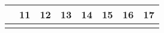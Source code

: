 {\begin{tabularx}{\linewidth}{|l!{\vrule width \myLenLineThicknessThick}*{7}{@{}X@{}|}}
    
  
  
  
  \hyperlink{week-2027-2}{} &
    
      
      
        \begin{minipage}[t]{6mm}\centering{}11\end{minipage}
      
       & 
    
      
      
        \begin{minipage}[t]{6mm}\centering{}12\end{minipage}
      
       & 
    
      
      
        \begin{minipage}[t]{6mm}\centering{}13\end{minipage}
      
       & 
    
      
      
        \begin{minipage}[t]{6mm}\centering{}14\end{minipage}
      
       & 
    
      
      
        \begin{minipage}[t]{6mm}\centering{}15\end{minipage}
      
       & 
    
      
      
        \begin{minipage}[t]{6mm}\centering{}16\end{minipage}
      
       & 
    
      
      
        \begin{minipage}[t]{6mm}\centering{}17\end{minipage}
      
      
        \\  \hline 
      
    
  
  
  
  \hyperlink{week-2027-3}{} &
    

\end{tabularx}}
